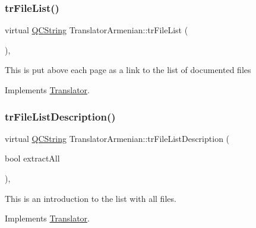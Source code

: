 \mbox{\label{class_translator_armenian_a4678226fbc12b6e68fd690b91efe8452}} 
\subsubsection{\texorpdfstring{trFileList()}{trFileList()}}
{\footnotesize\ttfamily virtual \mbox{\hyperlink{class_q_c_string}{Q\+C\+String}} Translator\+Armenian\+::tr\+File\+List (\begin{DoxyParamCaption}{ }\end{DoxyParamCaption})\hspace{0.3cm}{\ttfamily [inline]}, {\ttfamily [virtual]}}

This is put above each page as a link to the list of documented files 

Implements \mbox{\hyperlink{class_translator}{Translator}}.

\mbox{\label{class_translator_armenian_a0e4ef90233f77bd2fbe15ea6daa945a0}} 
\subsubsection{\texorpdfstring{trFileListDescription()}{trFileListDescription()}}
{\footnotesize\ttfamily virtual \mbox{\hyperlink{class_q_c_string}{Q\+C\+String}} Translator\+Armenian\+::tr\+File\+List\+Description (\begin{DoxyParamCaption}\item[{bool}]{extract\+All }\end{DoxyParamCaption})\hspace{0.3cm}{\ttfamily [inline]}, {\ttfamily [virtual]}}

This is an introduction to the list with all files. 

Implements \mbox{\hyperlink{class_translator}{Translator}}.

\mbox{\label{class_translator_armenian_a98b2c53503c1e45dfd8219c9782bfb40}} 
